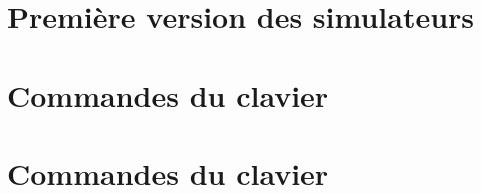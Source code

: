 %
%
\begin{appendix}
\chapter{Première version des simulateurs}


\newpage
\chapter{Commandes du clavier}


\newpage
\chapter{Commandes du clavier}


%
\end{appendix}
%
%
